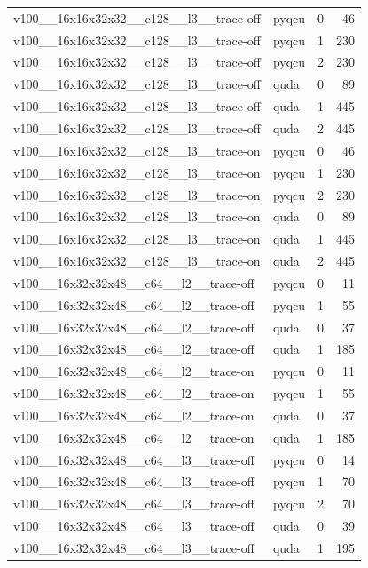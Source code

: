 \begin{table}[htbp]
\begin{tabular}{@{}llrr@{}}
v100\_\_16x16x32x32\_\_c128\_\_l3\_\_trace-off & pyqcu & 0 & 46 \\
v100\_\_16x16x32x32\_\_c128\_\_l3\_\_trace-off & pyqcu & 1 & 230 \\
v100\_\_16x16x32x32\_\_c128\_\_l3\_\_trace-off & pyqcu & 2 & 230 \\
v100\_\_16x16x32x32\_\_c128\_\_l3\_\_trace-off & quda & 0 & 89 \\
v100\_\_16x16x32x32\_\_c128\_\_l3\_\_trace-off & quda & 1 & 445 \\
v100\_\_16x16x32x32\_\_c128\_\_l3\_\_trace-off & quda & 2 & 445 \\
v100\_\_16x16x32x32\_\_c128\_\_l3\_\_trace-on & pyqcu & 0 & 46 \\
v100\_\_16x16x32x32\_\_c128\_\_l3\_\_trace-on & pyqcu & 1 & 230 \\
v100\_\_16x16x32x32\_\_c128\_\_l3\_\_trace-on & pyqcu & 2 & 230 \\
v100\_\_16x16x32x32\_\_c128\_\_l3\_\_trace-on & quda & 0 & 89 \\
v100\_\_16x16x32x32\_\_c128\_\_l3\_\_trace-on & quda & 1 & 445 \\
v100\_\_16x16x32x32\_\_c128\_\_l3\_\_trace-on & quda & 2 & 445 \\
v100\_\_16x32x32x48\_\_c64\_\_l2\_\_trace-off & pyqcu & 0 & 11 \\
v100\_\_16x32x32x48\_\_c64\_\_l2\_\_trace-off & pyqcu & 1 & 55 \\
v100\_\_16x32x32x48\_\_c64\_\_l2\_\_trace-off & quda & 0 & 37 \\
v100\_\_16x32x32x48\_\_c64\_\_l2\_\_trace-off & quda & 1 & 185 \\
v100\_\_16x32x32x48\_\_c64\_\_l2\_\_trace-on & pyqcu & 0 & 11 \\
v100\_\_16x32x32x48\_\_c64\_\_l2\_\_trace-on & pyqcu & 1 & 55 \\
v100\_\_16x32x32x48\_\_c64\_\_l2\_\_trace-on & quda & 0 & 37 \\
v100\_\_16x32x32x48\_\_c64\_\_l2\_\_trace-on & quda & 1 & 185 \\
v100\_\_16x32x32x48\_\_c64\_\_l3\_\_trace-off & pyqcu & 0 & 14 \\
v100\_\_16x32x32x48\_\_c64\_\_l3\_\_trace-off & pyqcu & 1 & 70 \\
v100\_\_16x32x32x48\_\_c64\_\_l3\_\_trace-off & pyqcu & 2 & 70 \\
v100\_\_16x32x32x48\_\_c64\_\_l3\_\_trace-off & quda & 0 & 39 \\
v100\_\_16x32x32x48\_\_c64\_\_l3\_\_trace-off & quda & 1 & 195 \\

\end{tabular}
\end{table}
